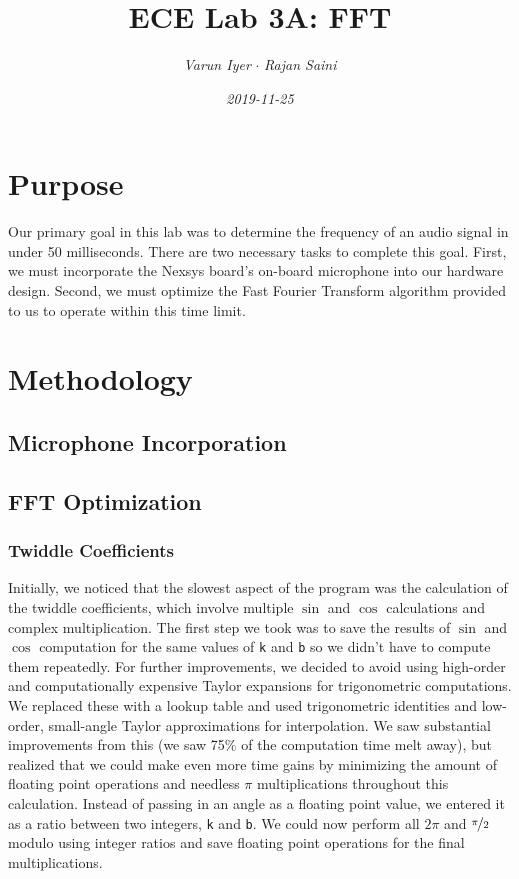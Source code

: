 \documentclass{article}
\title{\textbf{ECE Lab 3A: FFT}}
\date{\textit{2019-11-25}}
\author{\textit{Varun Iyer} \hspace{2em}$\cdot$ \hspace{2em} \textit{Rajan Saini}}
\begin{document}
\maketitle
\section{Purpose}
	Our primary goal in this lab was to determine the frequency of an audio signal in under 50 milliseconds.
	There are two necessary tasks to complete this goal.
	First, we must incorporate the Nexsys board’s on-board microphone into our hardware design.
	Second, we must optimize the Fast Fourier Transform algorithm provided to us to operate within this time limit.
\section{Methodology}
	\subsection{Microphone Incorporation}	
	\subsection{FFT Optimization}
		\subsubsection{Twiddle Coefficients}
			Initially, we noticed that the slowest aspect of the program was the calculation of the twiddle coefficients, which involve multiple $\sin$ and $\cos$ calculations and complex multiplication.
			The first step we took was to save the results of $\sin$ and $\cos$ computation for the same values of \texttt{k} and \texttt{b} so we didn’t have to compute them repeatedly.
			For further improvements, we decided to avoid using high-order and computationally expensive Taylor expansions for trigonometric computations.
			We replaced these with a lookup table and used trigonometric identities and low-order, small-angle Taylor approximations for interpolation.
			We saw substantial improvements from this (we saw 75\% of the computation time melt away), but realized that we could make even more time gains by minimizing the amount of floating point operations and needless $\pi$ multiplications throughout this calculation.
			Instead of passing in an angle as a floating point value, we entered it as a ratio between two integers, \texttt{k} and \texttt{b}.
			We could now perform all $2\pi$ and $\nicefrac{\pi}{2}$ modulo using integer ratios and save floating point operations for the final multiplications.
\end{document}
